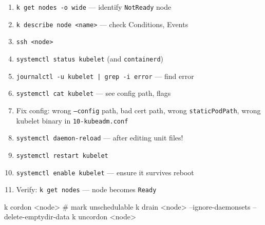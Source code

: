 \begin{tcbitemize}[
  raster columns=3, raster equal height=rows,
  blanker, cheat subtitle
]
\begin{tcbitemize}[
      raster columns=1, raster equal height=rows,
      blanker, cheat subtitle
    ]
      \tcbitem
        {\fontsize{6.5}{7.5}\selectfont\sffamily
        \begin{enumerate}[leftmargin=1.2em, itemsep=0pt, parsep=0pt, topsep=1pt]
          \item \texttt{k get nodes -o wide} — identify \texttt{NotReady} node
          \item \texttt{k describe node <name>} — check Conditions, Events
          \item \texttt{ssh <node>}
          \item \texttt{systemctl status kubelet} (and \texttt{containerd})
          \item \texttt{journalctl -u kubelet | grep -i error} — find error
          \item \texttt{systemctl cat kubelet} — see config path, flags
          \item Fix config: wrong \texttt{--config} path, bad cert path, wrong \texttt{staticPodPath}, wrong kubelet binary in \texttt{10-kubeadm.conf}
          \item \texttt{systemctl daemon-reload} — after editing unit files!
          \item \texttt{systemctl restart kubelet}
          \item \texttt{systemctl enable kubelet} — ensure it survives reboot
          \item Verify: \texttt{k get nodes} — node becomes \texttt{Ready}
        \end{enumerate}}
        \begin{cheatcodebash}
k cordon <node>             # mark unschedulable
k drain <node> --ignore-daemonsets --delete-emptydir-data
k uncordon <node>
        \end{cheatcodebash}


\end{tcbitemize}
\end{tcbitemize}
